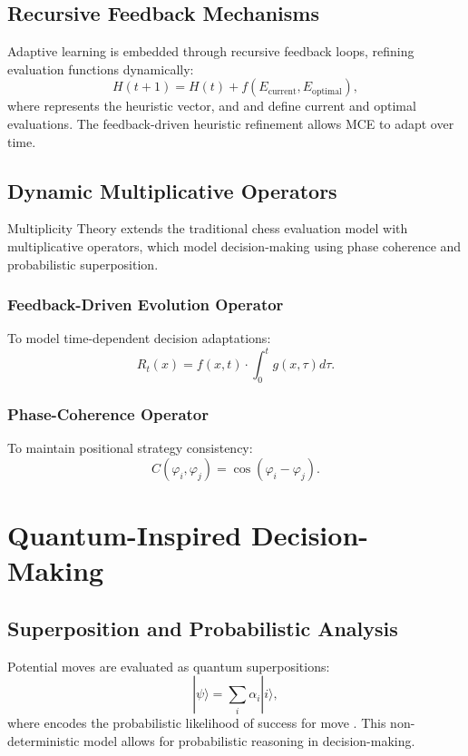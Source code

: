 \documentclass{article}
\begin{document}
\subsection{Recursive Feedback Mechanisms} Adaptive learning is embedded through recursive feedback loops, refining evaluation functions dynamically: \begin{equation} H(t+1) = H(t) + f(E_{\text{current}}, E_{\text{optimal}}), \end{equation} where  represents the heuristic vector, and  and  define current and optimal evaluations. The feedback-driven heuristic refinement allows MCE to adapt over time.

\subsection{Dynamic Multiplicative Operators} Multiplicity Theory extends the traditional chess evaluation model with multiplicative operators, which model decision-making using phase coherence and probabilistic superposition.

\subsubsection{Feedback-Driven Evolution Operator} To model time-dependent decision adaptations: \begin{equation} R_t(x) = f(x, t) \cdot \int_0^t g(x, \tau) d\tau. \end{equation}

\subsubsection{Phase-Coherence Operator} To maintain positional strategy consistency: \begin{equation} C(\varphi_i, \varphi_j) = \cos(\varphi_i - \varphi_j). \end{equation}

\section{Quantum-Inspired Decision-Making} \subsection{Superposition and Probabilistic Analysis} Potential moves are evaluated as quantum superpositions: \begin{equation} |\psi\rangle = \sum_{i} \alpha_i |i\rangle, \end{equation} where  encodes the probabilistic likelihood of success for move . This non-deterministic model allows for probabilistic reasoning in decision-making.
\end{document}
